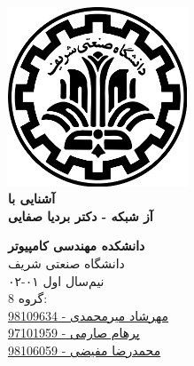 \documentclass[12pt]{article}
\begin{document}
\begin{titlepage}
	\begin{center}
		\vspace{0.2cm}
		
		\includegraphics[width=0.4\textwidth]{sharif.png}\\
		\vspace{0.2cm}
		\textbf{ \Huge{آشنایی با }}\\
		\vspace{0.25cm}
		\textbf{ \Large{آز شبکه - دکتر بردیا صفایی}}
		\vspace{0.2cm}
		
		
		\large \textbf{دانشکده مهندسی کامپیوتر}\\\vspace{0.1cm}
		\large   دانشگاه صنعتی شریف\\\vspace{0.2cm}
		\large   ﻧﯿﻢ‌سال اول ۰۱-۰۲ \\\vspace{0.10cm}
		\large{ گروه 8:}\\
		\large{\href{mailto:mehrshad.mirmohammadi@gmail.com}{مهرشاد میرمحمدی - 98109634}}\\
		\large{\href{mailto:parhaamsaremi@gmail.com}{پرهام صارمی - 97101959}}\\
		\large{\href{mailto:mofayezi.m@gmail.com}{محمدرضا مفیضی - 98106059}}\\
	\end{center}
\end{titlepage}

\newpage

\pagestyle{fancy}
\fancyhf{}
\fancyfoot{}
\setlength{\headheight}{59pt}
\cfoot{\thepage}
\end{document}
